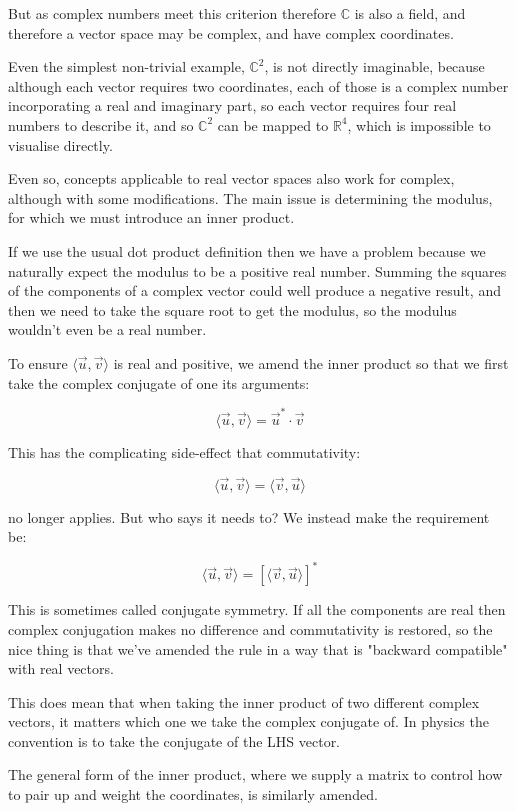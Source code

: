But as complex numbers meet this criterion therefore $\mathbb{C}$ is also a field, and therefore a vector space may be complex, and have complex coordinates.

Even the simplest non-trivial example, $\mathbb{C}^2$, is not directly imaginable, because although each vector requires two coordinates, each of those is a complex number incorporating a real and imaginary part, so each vector requires four real numbers to describe it, and so $\mathbb{C}^2$ can be mapped to $\mathbb{R}^4$, which is impossible to visualise directly.

Even so, concepts applicable to real vector spaces also work for complex, although with some modifications. The main issue is determining the modulus, for which we must introduce an inner product.

If we use the usual dot product definition then we have a problem because we naturally expect the modulus to be a positive real number. Summing the squares of the components of a complex vector could well produce a negative result, and then we need to take the square root to get the modulus, so the modulus wouldn't even be a real number.

To ensure $\langle \vec{u}, \vec{v} \rangle$ is real and positive, we amend the inner product so that we first take the complex conjugate of one its arguments:

$$
\langle \vec{u}, \vec{v} \rangle
=
\vec{u}^* \cdot \vec{v}
$$

This has the complicating side-effect that commutativity:

$$
\langle \vec{u}, \vec{v} \rangle
=
\langle \vec{v}, \vec{u} \rangle
$$

no longer applies. But who says it needs to? We instead make the requirement be:

$$
\langle \vec{u}, \vec{v} \rangle
=
\left[ \langle \vec{v}, \vec{u} \rangle \right]^*
$$

This is sometimes called conjugate symmetry. If all the components are real then complex conjugation makes no difference and commutativity is restored, so the nice thing is that we've amended the rule in a way that is "backward compatible" with real vectors.

This does mean that when taking the inner product of two different complex vectors, it matters which one we take the complex conjugate of. In physics the convention is to take the conjugate of the LHS vector.

The general form of the inner product, where we supply a matrix to control how to pair up and weight the coordinates, is similarly amended.

